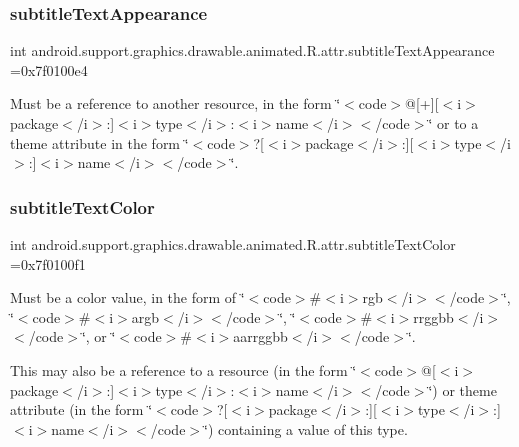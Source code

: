 \subsubsection{\texorpdfstring{subtitle\+Text\+Appearance}{subtitleTextAppearance}}
{\footnotesize\ttfamily int android.\+support.\+graphics.\+drawable.\+animated.\+R.\+attr.\+subtitle\+Text\+Appearance =0x7f0100e4\hspace{0.3cm}{\ttfamily [static]}}

Must be a reference to another resource, in the form \char`\"{}$<$code$>$@\mbox{[}+\mbox{]}\mbox{[}$<$i$>$package$<$/i$>$\+:\mbox{]}$<$i$>$type$<$/i$>$\+:$<$i$>$name$<$/i$>$$<$/code$>$\char`\"{} or to a theme attribute in the form \char`\"{}$<$code$>$?\mbox{[}$<$i$>$package$<$/i$>$\+:\mbox{]}\mbox{[}$<$i$>$type$<$/i$>$\+:\mbox{]}$<$i$>$name$<$/i$>$$<$/code$>$\char`\"{}. \mbox{\label{classandroid_1_1support_1_1graphics_1_1drawable_1_1animated_1_1R_1_1attr_a8d0b074f45038592bb934a91b1bdc161}} 
\subsubsection{\texorpdfstring{subtitle\+Text\+Color}{subtitleTextColor}}
{\footnotesize\ttfamily int android.\+support.\+graphics.\+drawable.\+animated.\+R.\+attr.\+subtitle\+Text\+Color =0x7f0100f1\hspace{0.3cm}{\ttfamily [static]}}

Must be a color value, in the form of \char`\"{}$<$code$>$\#$<$i$>$rgb$<$/i$>$$<$/code$>$\char`\"{}, \char`\"{}$<$code$>$\#$<$i$>$argb$<$/i$>$$<$/code$>$\char`\"{}, \char`\"{}$<$code$>$\#$<$i$>$rrggbb$<$/i$>$$<$/code$>$\char`\"{}, or \char`\"{}$<$code$>$\#$<$i$>$aarrggbb$<$/i$>$$<$/code$>$\char`\"{}. 

This may also be a reference to a resource (in the form \char`\"{}$<$code$>$@\mbox{[}$<$i$>$package$<$/i$>$\+:\mbox{]}$<$i$>$type$<$/i$>$\+:$<$i$>$name$<$/i$>$$<$/code$>$\char`\"{}) or theme attribute (in the form \char`\"{}$<$code$>$?\mbox{[}$<$i$>$package$<$/i$>$\+:\mbox{]}\mbox{[}$<$i$>$type$<$/i$>$\+:\mbox{]}$<$i$>$name$<$/i$>$$<$/code$>$\char`\"{}) containing a value of this type. \mbox{\label{classandroid_1_1support_1_1graphics_1_1drawable_1_1animated_1_1R_1_1attr_a540b592c68f05f7ccdd4d4c4ae627b98}} 
